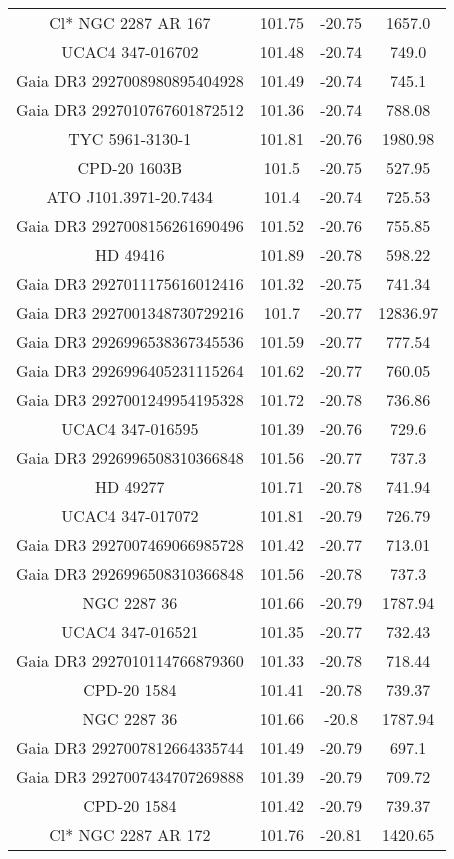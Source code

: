 \begin{table}
\begin{tabular}{cccc}
Cl* NGC 2287     AR     167 & 101.75 & -20.75 & 1657.0 \\
UCAC4 347-016702 & 101.48 & -20.74 & 749.0 \\
Gaia DR3 2927008980895404928 & 101.49 & -20.74 & 745.1 \\
Gaia DR3 2927010767601872512 & 101.36 & -20.74 & 788.08 \\
TYC 5961-3130-1 & 101.81 & -20.76 & 1980.98 \\
CPD-20  1603B & 101.5 & -20.75 & 527.95 \\
ATO J101.3971-20.7434 & 101.4 & -20.74 & 725.53 \\
Gaia DR3 2927008156261690496 & 101.52 & -20.76 & 755.85 \\
HD  49416 & 101.89 & -20.78 & 598.22 \\
Gaia DR3 2927011175616012416 & 101.32 & -20.75 & 741.34 \\
Gaia DR3 2927001348730729216 & 101.7 & -20.77 & 12836.97 \\
Gaia DR3 2926996538367345536 & 101.59 & -20.77 & 777.54 \\
Gaia DR3 2926996405231115264 & 101.62 & -20.77 & 760.05 \\
Gaia DR3 2927001249954195328 & 101.72 & -20.78 & 736.86 \\
UCAC4 347-016595 & 101.39 & -20.76 & 729.6 \\
Gaia DR3 2926996508310366848 & 101.56 & -20.77 & 737.3 \\
HD  49277 & 101.71 & -20.78 & 741.94 \\
UCAC4 347-017072 & 101.81 & -20.79 & 726.79 \\
Gaia DR3 2927007469066985728 & 101.42 & -20.77 & 713.01 \\
Gaia DR3 2926996508310366848 & 101.56 & -20.78 & 737.3 \\
NGC  2287    36 & 101.66 & -20.79 & 1787.94 \\
UCAC4 347-016521 & 101.35 & -20.77 & 732.43 \\
Gaia DR3 2927010114766879360 & 101.33 & -20.78 & 718.44 \\
CPD-20  1584 & 101.41 & -20.78 & 739.37 \\
NGC  2287    36 & 101.66 & -20.8 & 1787.94 \\
Gaia DR3 2927007812664335744 & 101.49 & -20.79 & 697.1 \\
Gaia DR3 2927007434707269888 & 101.39 & -20.79 & 709.72 \\
CPD-20  1584 & 101.42 & -20.79 & 739.37 \\
Cl* NGC 2287     AR     172 & 101.76 & -20.81 & 1420.65 \\

\end{tabular}
\end{table}
